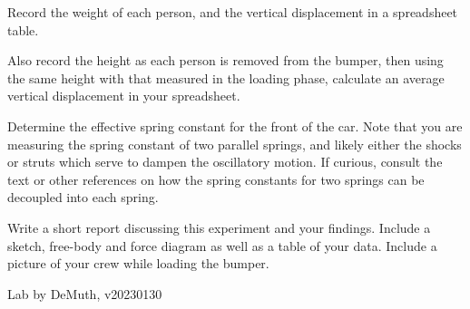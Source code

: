 \documentclass[14pt]{article}
\begin{document}
Record the weight of each person, and the vertical displacement in a spreadsheet table.

Also record the height as each person is removed from the bumper, then using the same height with
that measured in the loading phase, calculate an average vertical displacement in your spreadsheet.

Determine the effective spring constant for the front of the car. Note that you are measuring the spring constant of two parallel springs, and likely either the shocks or struts which serve to dampen the oscillatory motion. If curious, consult the text or other references on how the spring constants for two springs can be decoupled into each spring.

Write a short report discussing this experiment and your findings. Include a sketch, free-body and force diagram as well as a table of your data. Include a picture of your crew while loading the bumper.


\vfill 
\centerline{\footnotesize Lab by DeMuth, v20230130}
\end{document}
